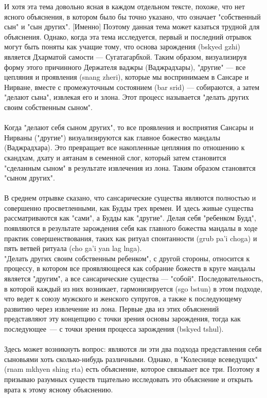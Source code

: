 \begin{siderules}
И хотя эта тема довольно ясная в каждом отдельном тексте, похоже, что нет ясного
объяснения, в котором было бы точно указано, что означает "собственный сын" и "сын
других". [Именно] Поэтому данная тема может казаться трудной для объяснения.
Однако, когда эта тема исследуется, первый и последний отрывок могут быть поняты как учащие
тому, что основа зарождения (bskyed gzhi) является Дхарматой самости — Сугатагарбхой.
Таким образом, визуализируя форму этого причинного Держате\-ля ваджры (Ваджрадхары),
"другие" — все цепляния и прояв\-ления (snang zheri), которые мы воспринимаем в Сансаре и
Нирване, вместе с промежуточным состоянием (bar srid) — собираются, а затем
"делают сына", извлекая его и злона. Этот процесс называется "делать других
своим собственным сыном".\\
\\
Когда "делают себя сыном других", то все проявления и восприятия Сансары и Нирваны
("другие") визуализируют\-ся как главное божество мандалы (Ваджрадхара). Это превра\-щает
все накопленные цепляния по отношению к скандхам, дхату и аятанам в семенной слог,
который затем становится "сделанным сыном" в результате извлечения из лона. Таким
образом становятся "сыном других".\\
\\
В среднем отрывке сказано, что сансарические существа являются полностью и совершенно
просветленными, как Будды трех времен. И здесь живые существа рассматрива\-ются как
"сами", а Будды как "другие". Делая себя "ребенком Будд", появляются в результате
зарождения себя как глав\-ного божества мандалы в ходе практик совершенствования,
таких как ритуал спонтанности (grub pa'i choga) и пять ветвей ритуала (cho ga'i yan lag lnga).\\
\newpage
"Делать других своим собственным ребенком", с другой стороны, относится к процессу,
в котором все проявляюще\-еся как собрание божеств в круге мандалы является "другим",
а все сансарические существа — "собой". После\-довательность, в которой каждый из них возникает,
гармонизируется (sgo bstun) в этом подходе, что ведет к союзу мужского и женского
супругов, а также к последую\-щему развитию через извлечение из лона. Первые два из этих
объяснений представляют эту концепцию с точки зрения основы зарож\-дения, тогда как
последующее — с точки зрения процесса зарождения (bskyed tshul).\\
\\
Здесь может возникнуть вопрос: являются ли эти два подхода представления себя сыновьями
хоть сколько-нибудь различными. Однако, в "Колеснице всеведущих" (rnam mkhyen shing
rta) есть объяснение, которое связывает все три. Поэтому я призываю разумных существ
тщательно исследовать это объяснение и открыть врата к этому ясному объяснению.
\end{siderules}
